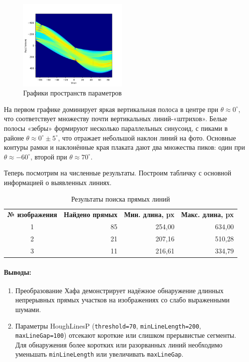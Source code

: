 \documentclass[a4paper,12pt]{article}
\begin{document}
\begin{figure}[H]
\begin{minipage}{0.48\textwidth}
    \end{minipage}
    \includegraphics[width=0.48\textwidth]{images/hough_lines/3_proc_accum.png}
    \caption{Графики пространств параметров}
\end{figure}

\noindent На первом графике доминирует яркая вертикальная полоса в центре при $\theta\approx0^\circ$, что соответствует множеству почти вертикальных линий-«штрихов». Белые полосы «зебры» формируют несколько параллельных синусоид, с пиками в районе $\theta\approx0^\circ\pm5^\circ$, что отражает небольшой наклон линий на фото. Основные контуры рамки и наклонённые края плаката дают два множества пиков: один при $\theta\approx-60^\circ$, второй при $\theta\approx70^\circ$. 

Теперь посмотрим на численные результаты. Построим табличку с основной информацией о выявленных линиях.

\begin{table}[h!]
    \centering
    \label{tab:hough-lines}
    \begin{tabular}{c *{3}{r}}
        \textbf{№ изображения} & \textbf{Найдено прямых} & \textbf{Мин. длина, px} & \textbf{Макс. длина, px} \\
        1 & 85 & 254{,}00 & 634{,}00 \\
        2 & 21 & 207{,}16 & 510{,}28 \\
        3 & 11 & 216{,}61 & 334{,}79 \\
    \end{tabular}
    \caption{Результаты поиска прямых линий}
    \end{table}

\paragraph{Выводы:}
\begin{enumerate}
    \item Преобразование Хафа демонстрирует надёжное обнаружение длинных непрерывных прямых участков на изображениях со слабо выраженными шумами.
    \item Параметры HoughLinesP (\texttt{threshold=70}, \texttt{minLineLength=200}, \texttt{maxLineGap=100}) отсекают короткие или слишком прерывистые сегменты. Для обнаружения более коротких или разорванных линий необходимо уменьшать \texttt{minLineLength} или увеличивать \texttt{maxLineGap}.
\end{enumerate}
\end{document}

